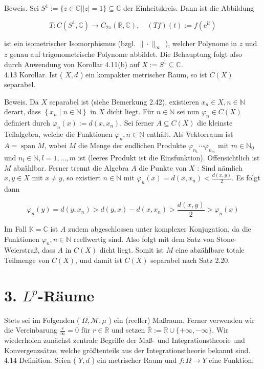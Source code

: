 \documentclass[10pt, letterpaper]{article}
\begin{document}
Beweis. Sei $S^{1}:=\{z \in \mathbb{C}| | z \mid=1\} \subseteq \mathbb{C}$ der Einheitskreis. Dann ist die Abbildung

$$
T: C\left(S^{1}, \mathbb{C}\right) \rightarrow C_{2 \pi}(\mathbb{R}, \mathbb{C}), \quad(T f)(t):=f\left(\mathrm{e}^{\mathrm{i} t}\right)
$$

ist ein isometrischer Isomorphismus (bzgl. $\|\cdot\|_{\infty}$ ), welcher Polynome in $z$ und $\bar{z}$ genau auf trigonometrische Polynome abbildet. Die Behauptung folgt also durch Anwendung von Korollar 4.11(b) auf $X:=S^{1} \subseteq \mathbb{C}$.\\
4.13 Korollar. Ist ( $X, d$ ) ein kompakter metrischer Raum, so ist $C(X)$ separabel.

Beweis. Da $X$ separabel ist (siehe Bemerkung 2.42), existieren $x_{n} \in X, n \in \mathbb{N}$ derart, dass $\left\{x_{n} \mid n \in \mathbb{N}\right\}$ in $X$ dicht liegt. Für $n \in \mathbb{N}$ sei nun $\varphi_{n} \in C(X)$ definiert durch $\varphi_{n}(x):=d\left(x, x_{n}\right)$. Sei ferner $A \subseteq C(X)$ die kleinste Teilalgebra, welche die Funktionen $\varphi_{n}, n \in \mathbb{N}$ enthält. Als Vektorraum ist $A=\operatorname{span} M$, wobei $M$ die Menge der endlichen Produkte $\varphi_{n_{1}} \cdots \varphi_{n_{m}}$ mit $m \in \mathbb{N}_{0}$ und $n_{l} \in \mathbb{N}, l=1, \ldots, m$ ist (leeres Produkt ist die Einsfunktion). Offensichtlich ist $M$ abzählbar. Ferner trennt die Algebra $A$ die Punkte von $X$ : Sind nämlich $x, y \in X$ mit $x \neq y$, so existiert $n \in \mathbb{N}$ mit $\varphi_{n}(x)=d\left(x, x_{n}\right)<\frac{d(x, y)}{2}$. Es folgt dann

$$
\varphi_{n}(y)=d\left(y, x_{n}\right)>d(y, x)-d\left(x, x_{n}\right)>\frac{d(x, y)}{2}>\varphi_{n}(x)
$$

Im Fall $\mathbb{K}=\mathbb{C}$ ist $A$ zudem abgeschlossen unter komplexer Konjugation, da die Funktionen $\varphi_{n}, n \in \mathbb{N}$ reellwertig sind. Also folgt mit dem Satz von Stone-Weierstraß, dass $A$ in $C(X)$ dicht liegt. Somit ist $M$ eine abzählbare totale Teilmenge von $C(X)$, und damit ist $C(X)$ separabel nach Satz 2.20.

\section*{3. $L^{p}$-Räume}
Stets sei im Folgenden ( $\Omega, \mathcal{M}, \mu$ ) ein (reeller) Maßraum. Ferner verwenden wir die Vereinbarung $\frac{r}{\infty}=0$ für $r \in \mathbb{R}$ und setzen $\overline{\mathbb{R}}:=\mathbb{R} \cup\{+\infty,-\infty\}$. Wir wiederholen zunächst zentrale Begriffe der Maß- und Integrationstheorie und Konvergenzsätze, welche größtenteils aus der Integrationstheorie bekannt sind.\\
4.14 Definition. Seien ( $Y, d$ ) ein metrischer Raum und $f: \Omega \rightarrow Y$ eine Funktion.
\end{document}
